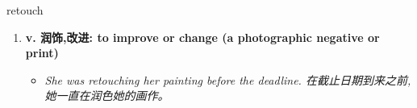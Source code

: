 
\begin{frame}
{\huge retouch}
\begin{center}
\begin{enumerate}\Large
  \item \textbf{v. 润饰,改进: to improve or change (a photographic negative or print)}
  \begin{itemize}
    \item \em{\Large{She was retouching her painting before the deadline. 在截止日期到来之前,她一直在润色她的画作。}}
  \end{itemize}
\end{enumerate}
\end{center}
\end{frame}
